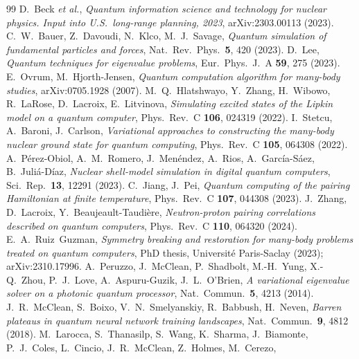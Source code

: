 \documentclass[
  aps,            %
  prc,            %
  reprint,        %
  superscriptaddress,
  floatfix,
  nofootinbib
]{revtex4-2}
\begin{document}
\begin{thebibliography}{99}
D.~Beck \textit{et al.},
\textit{Quantum information science and technology for nuclear physics.
Input into U.S.\ long-range planning, 2023},
arXiv:2303.00113 (2023).
C.~W.~Bauer, Z.~Davoudi, N.~Klco, M.~J.~Savage,
\textit{Quantum simulation of fundamental particles and forces},
Nat.\ Rev.\ Phys.\ \textbf{5}, 420 (2023).
D.~Lee,
\textit{Quantum techniques for eigenvalue problems},
Eur.\ Phys.\ J.\ A \textbf{59}, 275 (2023).
E.~Ovrum, M.~Hjorth-Jensen,
\textit{Quantum computation algorithm for many-body studies},
arXiv:0705.1928 (2007).
M.~Q.~Hlatshwayo, Y.~Zhang, H.~Wibowo, R.~LaRose, D.~Lacroix, E.~Litvinova,
\textit{Simulating excited states of the Lipkin model on a quantum computer},
Phys.\ Rev.\ C \textbf{106}, 024319 (2022).
I.~Stetcu, A.~Baroni, J.~Carlson,
\textit{Variational approaches to constructing the many-body nuclear ground state
for quantum computing},
Phys.\ Rev.\ C \textbf{105}, 064308 (2022).
A.~P\'erez-Obiol, A.~M.~Romero, J.~Men\'endez, A.~Rios, A.~Garc\'ia-S\'aez,
B.~Juli\'a-D\'iaz,
\textit{Nuclear shell-model simulation in digital quantum computers},
Sci.\ Rep.\ \textbf{13}, 12291 (2023).
C.~Jiang, J.~Pei,
\textit{Quantum computing of the pairing Hamiltonian at finite temperature},
Phys.\ Rev.\ C \textbf{107}, 044308 (2023).
J.~Zhang, D.~Lacroix, Y.~Beaujeault-Taudi\`ere,
\textit{Neutron-proton pairing correlations described on quantum computers},
Phys.\ Rev.\ C \textbf{110}, 064320 (2024).
E.~A.~Ruiz~Guzman,
\textit{Symmetry breaking and restoration for many-body problems treated on
quantum computers},
PhD thesis, Universit\'e Paris-Saclay (2023); arXiv:2310.17996.
A.~Peruzzo, J.~McClean, P.~Shadbolt, M.-H.~Yung, X.-Q.~Zhou, P.~J.~Love,
A.~Aspuru-Guzik, J.~L.~O'Brien,
\textit{A variational eigenvalue solver on a photonic quantum processor},
Nat.\ Commun.\ \textbf{5}, 4213 (2014).
J.~R.~McClean, S.~Boixo, V.~N.~Smelyanskiy, R.~Babbush, H.~Neven,
\textit{Barren plateaus in quantum neural network training landscapes},
Nat.\ Commun.\ \textbf{9}, 4812 (2018).
M.~Larocca, S.~Thanasilp, S.~Wang, K.~Sharma, J.~Biamonte, P.~J.~Coles,
L.~Cincio, J.~R.~McClean, Z.~Holmes, M.~Cerezo,

\end{thebibliography}
\end{document}
